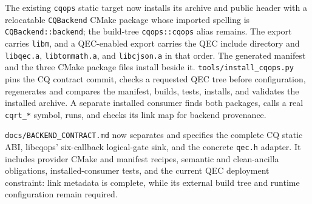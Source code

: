 The existing \texttt{cqops} static target now installs its archive and public
header with a relocatable \texttt{CQBackend} CMake package whose imported spelling
is \texttt{CQBackend::backend}; the build-tree \texttt{cqops::cqops} alias remains.
The export carries \texttt{libm}, and a QEC-enabled export carries the QEC include
directory and \texttt{libqec.a}, \texttt{libtommath.a}, and \texttt{libcjson.a} in
that order.  The generated manifest and the three CMake package files install
beside it.  \texttt{tools/install\_cqops.py} pins the CQ contract commit, checks a
requested QEC tree before configuration, regenerates and compares the manifest,
builds, tests, installs, and validates the installed archive.  A separate installed
consumer finds both packages, calls a real \texttt{cqrt\_*} symbol, runs, and checks
its link map for backend provenance.

\texttt{docs/BACKEND\_CONTRACT.md} now separates and specifies the complete CQ
static ABI, libcqops' six-callback logical-gate sink, and the concrete
\texttt{qec.h} adapter.  It includes provider CMake and manifest recipes,
semantic and clean-ancilla obligations, installed-consumer tests, and the current
QEC deployment constraint: link metadata is complete, while its external build
tree and runtime configuration remain required.

\begin{figures}
\end{figures}

